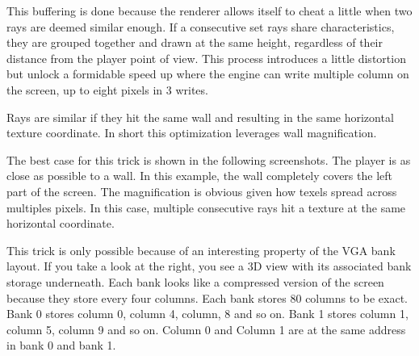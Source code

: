 \par
This buffering is done because the renderer allows itself to cheat a little when two rays are deemed similar enough. If a consecutive set rays share characteristics, they are grouped together and drawn at the same height, regardless of their distance from the player point of view. This process introduces a little distortion but unlock a formidable speed up where the engine can write multiple column on the screen, up to eight pixels in 3 writes.\\
\par
Rays are similar if they hit the same wall and resulting in the same  horizontal texture coordinate. In short this optimization leverages wall magnification.\\

\par
The best case for this trick is shown in the following screenshots. The player is as close as possible to a wall. In this example, the wall completely covers the left part of the screen. The magnification is obvious given how texels spread across multiples pixels. In this case, multiple consecutive rays hit a texture at the same horizontal coordinate.\\
\begin{figure}[H]
 \centering
\end{figure}

This trick is only possible because of an interesting property of the VGA bank layout. If you take a look at the right, you see a 3D view with its associated bank storage underneath. Each bank looks like a compressed version of the screen because they store every four columns. Each bank stores 80 columns to be exact. Bank 0 stores column 0, column 4, column, 8 and so on. Bank 1 stores column 1, column 5, column 9 and so on. Column 0 and Column 1 are at the same address in bank 0 and bank 1.
 \par
  \begin{minipage}{\textwidth}
 
\centering
\vspace*{0.5cm}
\centering


 \end{minipage}

\par

